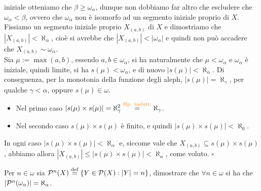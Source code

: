 	iniziale otteniamo che $\beta \geq \omega_\alpha$, dunque non dobbiamo far altro che escludere che $\omega_\alpha < \beta$, ovvero che $\omega_\alpha$ non è isomorfo ad un segmento iniziale proprio di $X$.\\
	Fissiamo un segmento iniziale proprio $X_{(a,b)}$ di $X$ e dimostriamo che $|X_{(a,b)}| < \aleph_\alpha$, cioè si avrebbe che $|X_{(a,b)}| < |\omega_\alpha|$ e quindi non può accadere che $X_{(a,b)} \sim \omega_\alpha$.\\
	Sia $\mu := \max(a,b)$, essendo $a,b \in \omega_\alpha$, si ha naturalmente che $\mu < \omega_\alpha$ e $\omega_\alpha$ è iniziale, quindi limite, si ha $s(\mu) < \omega_{\alpha}$, e di nuovo $|s(\mu)| < \aleph_\alpha$. Di conseguenza, per la monotonia della funzione degli aleph, $|s(\mu)| = \aleph_\gamma$, per qualche $\gamma < \alpha$, oppure $s(\mu) \in \omega$.
	\begin{itemize}
		\item Nel primo caso $|s(\mu) \times s(\mu)| = \aleph_\gamma^2 \overset{\text{\textcolor{orange}{Hp. indutt.}}}{=} \aleph_\gamma$.
		\item Nel secondo caso $s(\mu) \times s(\mu)$ è finito, e quindi $|s(\mu) \times s(\mu)| < \aleph_0$.
	\end{itemize}
	In ogni caso $|s(\mu) \times s(\mu)| < \aleph_\alpha$ e, siccome vale che $X_{(a,b)} \subseteq s(\mu) \times s(\mu)$, abbiamo allora $|X_{(a,b)}| \leq |s(\mu) \times s(\mu)| < \aleph_\alpha$, come voluto. \hfill $\square$

\begin{exercise}
	Per $n \in \omega$ sia $\mathcal{P}^n(X) \overset{\text{def}}{=} \{Y \in \mathcal{P}(X) : |Y| = n\}$, dimostrare che $\forall n \in \omega$ si ha che $|\mathcal{P}^n(\omega_\alpha)| = \aleph_\alpha$.
\end{exercise}

